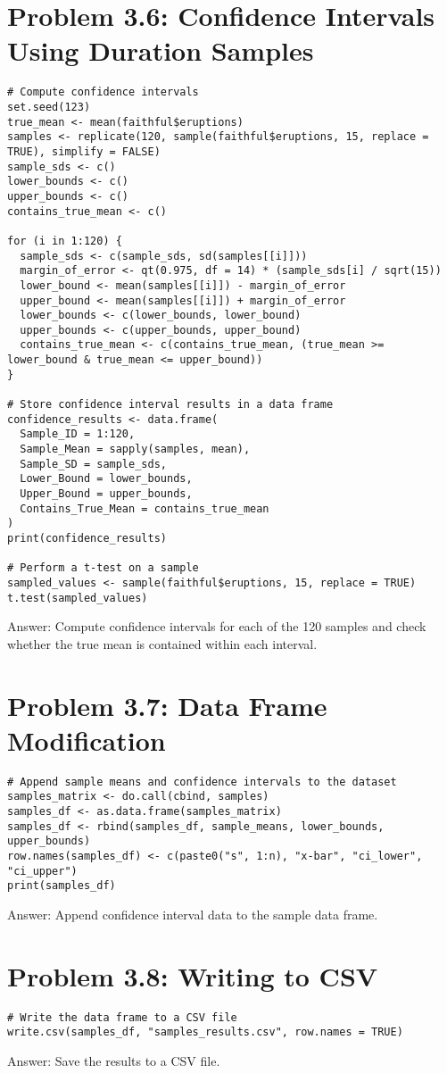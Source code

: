 \documentclass{article}
\begin{document}
\section{Problem 3.6: Confidence Intervals Using Duration Samples}
\begin{tcolorbox}
\begin{lstlisting}
# Compute confidence intervals
set.seed(123)
true_mean <- mean(faithful$eruptions)
samples <- replicate(120, sample(faithful$eruptions, 15, replace = TRUE), simplify = FALSE)
sample_sds <- c()
lower_bounds <- c()
upper_bounds <- c()
contains_true_mean <- c()

for (i in 1:120) {
  sample_sds <- c(sample_sds, sd(samples[[i]]))
  margin_of_error <- qt(0.975, df = 14) * (sample_sds[i] / sqrt(15))
  lower_bound <- mean(samples[[i]]) - margin_of_error
  upper_bound <- mean(samples[[i]]) + margin_of_error
  lower_bounds <- c(lower_bounds, lower_bound)
  upper_bounds <- c(upper_bounds, upper_bound)
  contains_true_mean <- c(contains_true_mean, (true_mean >= lower_bound & true_mean <= upper_bound))
}

# Store confidence interval results in a data frame
confidence_results <- data.frame(
  Sample_ID = 1:120,
  Sample_Mean = sapply(samples, mean),
  Sample_SD = sample_sds,
  Lower_Bound = lower_bounds,
  Upper_Bound = upper_bounds,
  Contains_True_Mean = contains_true_mean
)
print(confidence_results)

# Perform a t-test on a sample
sampled_values <- sample(faithful$eruptions, 15, replace = TRUE)
t.test(sampled_values)
\end{lstlisting}
\end{tcolorbox}
Answer: Compute confidence intervals for each of the 120 samples and check whether the true mean is contained within each interval.


\section{Problem 3.7: Data Frame Modification}
\begin{tcolorbox}
\begin{lstlisting}
# Append sample means and confidence intervals to the dataset
samples_matrix <- do.call(cbind, samples)
samples_df <- as.data.frame(samples_matrix)
samples_df <- rbind(samples_df, sample_means, lower_bounds, upper_bounds)
row.names(samples_df) <- c(paste0("s", 1:n), "x-bar", "ci_lower", "ci_upper")
print(samples_df)
\end{lstlisting}
\end{tcolorbox}
Answer: Append confidence interval data to the sample data frame.

\section{Problem 3.8: Writing to CSV}
\begin{tcolorbox}
\begin{lstlisting}
# Write the data frame to a CSV file
write.csv(samples_df, "samples_results.csv", row.names = TRUE)
\end{lstlisting}
\end{tcolorbox}
Answer: Save the results to a CSV file.
\end{document}
